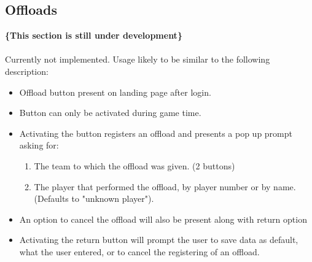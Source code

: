 \documentclass[hidelinks,a4paper,12pt]{article}
\begin{document}
	\subsection{Offloads}
	{\bfseries\{This section is still under development\}}\\ \\
	Currently not implemented. Usage likely to be similar to the following description:
	\begin{itemize}
		\item Offload button present on landing page after login.
		\item Button can only be activated during game time.
		\item Activating the button registers an offload and presents a pop up prompt asking for:
			\begin{enumerate}
				\item The team to which the offload was given. (2 buttons)
				\item The player that performed the offload, by player number or by name. (Defaults to "unknown player").
			\end{enumerate}
		\item An option to cancel the offload will also be present along with return option
		\item Activating the return button will prompt the user to save data as default, what the user entered, or to cancel the registering of an offload.
	\end{itemize}
\end{document}
